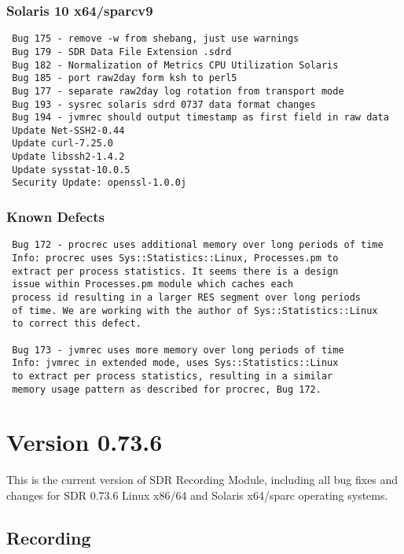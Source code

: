 \subsubsection*{Solaris 10 x64/sparcv9}
\begin{verbatim}
 Bug 175 - remove -w from shebang, just use warnings
 Bug 179 - SDR Data File Extension .sdrd
 Bug 182 - Normalization of Metrics CPU Utilization Solaris
 Bug 185 - port raw2day form ksh to perl5
 Bug 177 - separate raw2day log rotation from transport mode
 Bug 193 - sysrec solaris sdrd 0737 data format changes
 Bug 194 - jvmrec should output timestamp as first field in raw data
 Update Net-SSH2-0.44
 Update curl-7.25.0
 Update libssh2-1.4.2
 Update sysstat-10.0.5
 Security Update: openssl-1.0.0j
\end{verbatim}

\subsubsection*{Known Defects}
\begin{verbatim}
 Bug 172 - procrec uses additional memory over long periods of time
 Info: procrec uses Sys::Statistics::Linux, Processes.pm to
 extract per process statistics. It seems there is a design
 issue within Processes.pm module which caches each
 process id resulting in a larger RES segment over long periods 
 of time. We are working with the author of Sys::Statistics::Linux
 to correct this defect.

 Bug 173 - jvmrec uses more memory over long periods of time
 Info: jvmrec in extended mode, uses Sys::Statistics::Linux
 to extract per process statistics, resulting in a similar 
 memory usage pattern as described for procrec, Bug 172.
\end{verbatim}


\section{Version 0.73.6}
\noindent
This is the current version of SDR Recording Module, including all bug 
fixes and changes for SDR 0.73.6 Linux x86/64 and Solaris x64/sparc 
operating systems. 

\subsection*{Recording}

